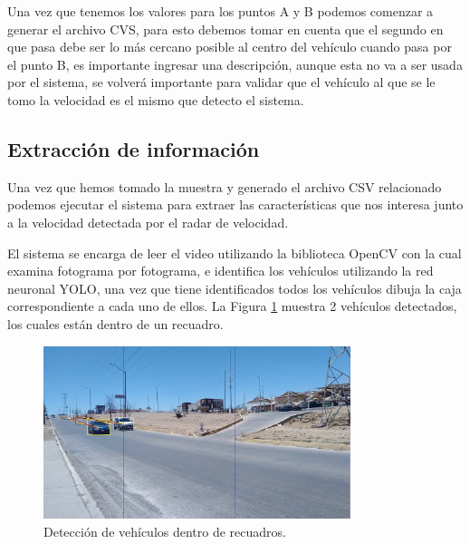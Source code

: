 Una vez que tenemos los valores para los puntos A y B podemos comenzar a generar el archivo CVS, para esto debemos tomar en cuenta que el segundo en que pasa debe ser lo más cercano posible al centro del vehículo cuando pasa por el punto B, es importante ingresar una descripción, aunque esta no va a ser usada por el sistema, se volverá importante para validar que el vehículo al que se le tomo la velocidad es el mismo que detecto el sistema.


\subsection{Extracción de información }

Una vez que hemos tomado la muestra y generado el archivo CSV relacionado podemos ejecutar el sistema para extraer las características que nos interesa junto a la velocidad detectada por el radar de velocidad.

El sistema se encarga de leer el video utilizando la biblioteca OpenCV con la cual examina fotograma por fotograma, e identifica los vehículos utilizando la red neuronal YOLO, una vez que tiene identificados todos los vehículos dibuja la caja correspondiente a cada uno de ellos. La Figura \ref{fig:LugarDeteccion} muestra 2 vehículos detectados, los cuales están dentro de un recuadro.

\begin{figure}[H]
    \centering
    \includegraphics[width=0.8\textwidth]{Metodologia/imgs/Deteccion.jpg}
    \caption{Detección de vehículos dentro de recuadros.}
    \label{fig:LugarDeteccion}
\end{figure}

